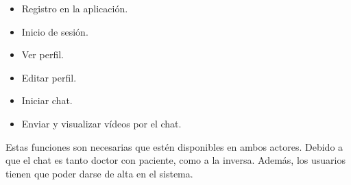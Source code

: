 \begin{itemize}
    \item Registro en la aplicación.
    \item Inicio de sesión.
    \item Ver perfil.
    \item Editar perfil.
    \item Iniciar chat.
    \item Enviar y visualizar vídeos por el chat.
\end{itemize}

Estas funciones son necesarias que estén disponibles en ambos actores. Debido a que el chat
es tanto doctor con paciente, como a la inversa. Además, los usuarios tienen que poder
darse de alta en el sistema.